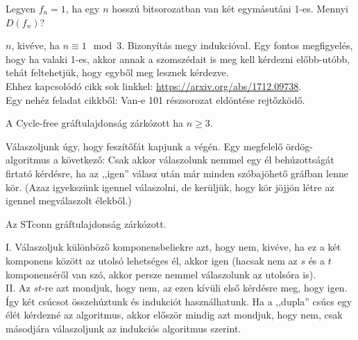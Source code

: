 \begin{Exercise}[counter={sorszam}, difficulty=0]
	Legyen $f_n=1$, ha egy $n$ hosszú bitsorozatban van két egymásutáni 1-es. Mennyi $D(f_n)$?
\end{Exercise}
\begin{Answer}
	$n$, kiv\'eve, ha $n\equiv 1 \mod 3$.
	Bizony\'it\'as megy indukci\'oval.
	Egy fontos megfigyel\'es, hogy ha valaki 1-es, akkor annak a szomsz\'edait is meg kell k\'erdezni el\H obb-ut\'obb, teh\'at feltehetj\"uk, hogy egyb\H ol meg lesznek k\'erdezve.\\
	Ehhez kapcsol\'od\'o cikk sok linkkel: \url{https://arxiv.org/abs/1712.09738}.\\
	Egy neh\'ez feladat cikkb\H ol: Van-e 101 r\'eszsorozat eld\"ont\'ese rejt\H ozk\"od\H o.
\end{Answer}

\begin{Exercise}[counter={sorszam}, difficulty=0]
	A {\la Cycle-free} gráftulajdonság zárkózott ha $n\ge 3$. 
\end{Exercise}
\begin{Answer}
	V\'alaszoljunk \'ugy, hogy fesz\'it\H of\'at kapjunk a v\'eg\'en.
	Egy megfelelő ördög-algoritmus a következő: Csak akkor válaszolunk nemmel egy él behúzottságát firtató kérdésre, ha az ,,igen'' válasz után már minden szóbajöhető gráfban lenne kör. (Azaz igyekszünk igennel válaszolni, de kerüljük, hogy kör jöjjön létre az igennel megválaszolt élekből.)
\end{Answer}

\begin{Exercise}[counter={sorszam}, difficulty=0]
	Az {\la STconn} gráftulajdonság zárkózott.
\end{Exercise}	
\begin{Answer}
	I. V\'alaszoljuk k\"ul\"onb\"oz\H o komponensbeliekre azt, hogy nem, kiv\'eve, ha ez a k\'et komponens k\"oz\"ott az utols\'o lehets\'eges \'el, akkor igen (hacsak nem az $s$ \'es a $t$ komponens\'er\H ol van sz\'o, akkor persze nemmel v\'alaszolunk az utols\'ora is).\\
	II. Az $st$-re azt mondjuk, hogy nem, az ezen k\'iv\"uli els\H o k\'erd\'esre meg, hogy igen. \'Igy k\'et cs\'ucsot \"osszeh\'uztunk \'es indukci\'ot haszn\'alhatunk. Ha a ,,dupla'' cs\'ucs egy \'el\'et k\'erdezn\'e az algoritmus, akkor el\H osz\"or mindig azt mondjuk, hogy nem, csak m\'asodj\'ara v\'alaszoljunk az indukci\'os algoritmus szerint.
\end{Answer}

